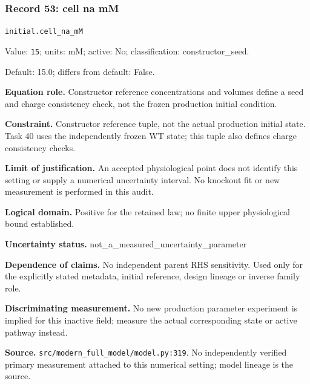 \subsubsection*{Record 53: cell na mM}
{\small \nolinkurl{initial.cell_na_mM}\par

Value: \texttt{15}; units: mM; active: No; classification: constructor\_seed.\par

Default: 15.0; differs from default: False.\par

\textbf{Equation role.} Constructor reference concentrations and volumes define a seed and charge consistency check, not the frozen production initial condition.\par

\textbf{Constraint.} Constructor reference tuple, not the actual production initial state. Task 40 uses the independently frozen WT state; this tuple also defines charge consistency checks.\par

\textbf{Limit of justification.} An accepted physiological point does not identify this setting or supply a numerical uncertainty interval. No knockout fit or new measurement is performed in this audit.\par

\textbf{Logical domain.} Positive for the retained law; no finite upper physiological bound established.\par

\textbf{Uncertainty status.} not\_a\_measured\_uncertainty\_parameter\par

\textbf{Dependence of claims.} No independent parent RHS sensitivity. Used only for the explicitly stated metadata, initial reference, design lineage or inverse family role.\par

\textbf{Discriminating measurement.} No new production parameter experiment is implied for this inactive field; measure the actual corresponding state or active pathway instead.\par

\textbf{Source.} \nolinkurl{src/modern_full_model/model.py:319}. No independently verified primary measurement attached to this numerical setting; model lineage is the source.\par}

